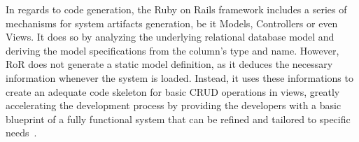In regards to code generation, the Ruby on Rails framework includes a series of mechanisms for system artifacts generation, be it Models, Controllers or even Views. It does so by analyzing the underlying relational database model and deriving the model specifications from the column's type and name. However, RoR does not generate a static model definition, as it deduces the necessary information whenever the system is loaded. Instead, it uses these informations to create an adequate code skeleton for basic CRUD operations in views, greatly accelerating the development process by providing the developers with a basic blueprint of a fully functional system that can be refined and tailored to specific needs~\cite{rails_generators}.
